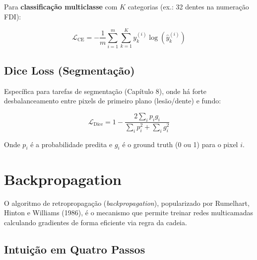 Para \textbf{classificação multiclasse} com $K$ categorias (ex.: 32 dentes na
numeração FDI):

\begin{equation}
  \mathcal{L}_{\text{CE}} = -\frac{1}{m} \sum_{i=1}^{m} \sum_{k=1}^{K}
    y_k^{(i)} \log(\hat{y}_k^{(i)})
  \label{eq:ce}
\end{equation}

\subsection{Dice Loss (Segmentação)}

Específica para tarefas de segmentação (Capítulo 8), onde há forte desbalanceamento
entre pixels de primeiro plano (lesão/dente) e fundo:

\begin{equation}
  \mathcal{L}_{\text{Dice}} = 1 - \frac{2 \sum_i p_i g_i}{\sum_i p_i^2 + \sum_i g_i^2}
  \label{eq:dice-loss}
\end{equation}

Onde $p_i$ é a probabilidade predita e $g_i$ é o ground truth (0 ou 1) para o pixel $i$.

\section{Backpropagation}
\label{sec:backpropagation}

O algoritmo de retropropagação (\textit{backpropagation}), popularizado por
Rumelhart, Hinton e Williams (1986), é o mecanismo que permite treinar redes
multicamadas calculando gradientes de forma eficiente via regra da cadeia.

\subsection{Intuição em Quatro Passos}


